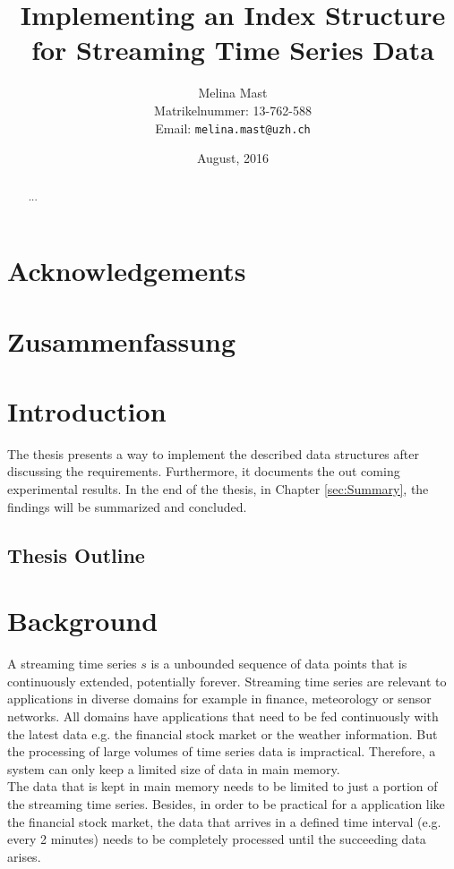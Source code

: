 \documentclass[abstracton,12pt]{scrreprt}
\title{Implementing an Index Structure for Streaming Time Series Data}
\author{
  Melina Mast\\[-5pt]
  \scriptsize Matrikelnummer: 13-762-588\\[-5pt]
  \scriptsize Email: \texttt{melina.mast@uzh.ch}
}
\date{\vspace*{2cm}August, 2016}
\begin{document}
\maketitle

\chapter*{Acknowledgements}



\begin{abstract}
  ...
\end{abstract}

\chapter*{Zusammenfassung}

\tableofcontents
\listoffigures
\listoftables
\listofalgorithms
\renewcommand{\lstlistingname}{Algorithm}%



\chapter{Introduction}

The thesis presents a way to implement the described data structures after discussing the requirements. Furthermore, it documents the out coming experimental results.
In the end of the thesis, in Chapter \ref{sec:Summary}, the findings will be summarized and concluded.

\section{Thesis Outline}


\newtheorem{defn}{Definition}[section]
\newtheorem{exmp}{Example}[section]
\newcommand*{\argmin}{\operatornamewithlimits{argmin}\limits}

\chapter{Background}
\label{background}
A streaming time series $s$ is a unbounded sequence of data points that is continuously extended, potentially forever. Streaming time series are relevant to applications in diverse domains for example in finance, meteorology or sensor networks. All domains have applications that need to be fed continuously with the latest data e.g. the financial stock market or the weather information. But the processing of large volumes of time series data is impractical. Therefore, a system can only keep a limited size of data in main memory.\\
The data that is kept in main memory needs to be limited to just a portion of the streaming time series. Besides, in order to be practical for a application like the financial stock market, the data that arrives in a defined time interval (e.g. every 2 minutes) needs to be completely processed until the succeeding data arises.
\end{document}
